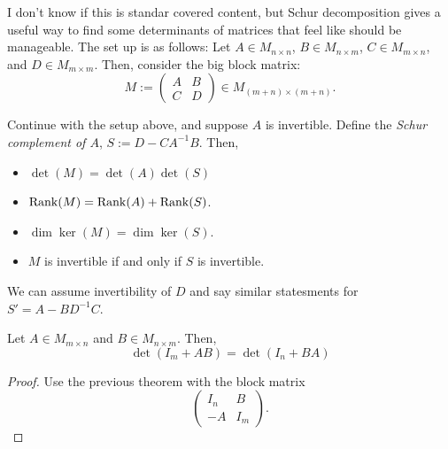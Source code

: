 I don't know if this is standar covered content, but Schur decomposition gives a useful way 
to find some determinants of matrices that feel like should be manageable. The set up is 
as follows:
Let $A \in M_{n \times n}$, $B \in M_{n \times m}$, $C \in M_{m \times n}$, and $D \in M_{m \times m}$.
Then, consider the big block matrix:
\[
M := \begin{pmatrix}
A & B \\
C & D
\end{pmatrix} \in M_{(m + n) \times (m + n)}.
\]
\begin{theorem}
Continue with the setup above, and suppose $A$ is invertible. 
Define the \emph{Schur complement of $A$}, $S := D - CA^{-1}B$. Then,
\begin{itemize}
    \item $\det(M) = \det(A) \det(S)$
    \item $\mathrm{Rank}(M) = \mathrm{Rank}(A) + \mathrm{Rank}(S)$.
    \item $\dim \ker(M) = \dim \ker(S)$.
    \item $M$ is invertible if and only if $S$ is invertible.
\end{itemize}
\end{theorem}

\begin{remark}
We can assume invertibility of $D$ and say similar statesments for $S' = A - BD^{-1}C$.
\end{remark}

\begin{theorem}
Let $A \in M_{m \times n}$ and $B \in M_{n \times m}$. Then,
\[
\det(I_m + AB) = \det(I_n + BA)
\]
\end{theorem}
\begin{proof}
Use the previous theorem with the block matrix
\[
\begin{pmatrix}
I_n & B \\
-A & I_m
\end{pmatrix}.
\]
\end{proof}